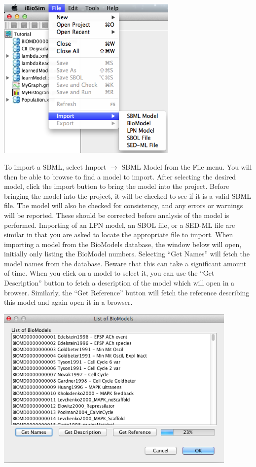 \documentclass[titlepage,11pt]{article}
\begin{document}
\begin{center}
\includegraphics[height=80mm]{screenshots/import}
\end{center} 

To import a SBML, select Import $\rightarrow$ SBML Model from the File menu.  
You will then be able to browse to find a model to import.  After  selecting the desired model, click the import button to bring the model into the project.  Before bringing the model into the project, it will be checked to see if it is a valid SBML file.  
The model will also be checked for consistency, and any errors or warnings will be reported.  These should be corrected before analysis of the model is performed.  Importing of an LPN model, an SBOL file, or a SED-ML file are similar in that you are asked to locate the appropriate file to import.  When importing a model from the BioModels database, the window below will open, initially only listing the BioModel numbers.  Selecting ``Get Names'' will fetch the model names from the database.  Beware that this can take a significant amount of time.  When you click on a model to select it, you can use the ``Get Description'' button to fetch a description of the model which will open in a browser.  Similarly, the ``Get Reference'' button will fetch the reference describing this model and again open it in a browser.

\begin{center}
\includegraphics[height=80mm]{screenshots/BioModels}
\end{center} 
\end{document}
